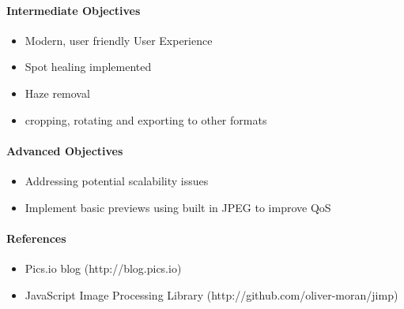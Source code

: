 \documentclass{article}
\begin{document}
    \paragraph{Intermediate Objectives}
        \begin{itemize}
          \item Modern, user friendly User Experience
          \item Spot healing implemented
          \item Haze removal
          \item cropping, rotating and exporting to other formats
        \end{itemize}
    \paragraph{Advanced Objectives}
        \begin{itemize}
          \item Addressing potential scalability issues
          \item Implement basic previews using built in JPEG to improve QoS
        \end{itemize}
    \paragraph{References}
        \begin{itemize}
          \item Pics.io blog (http://blog.pics.io)
          \item JavaScript Image Processing Library (http://github.com/oliver-moran/jimp)
        \end{itemize}
\end{document}
